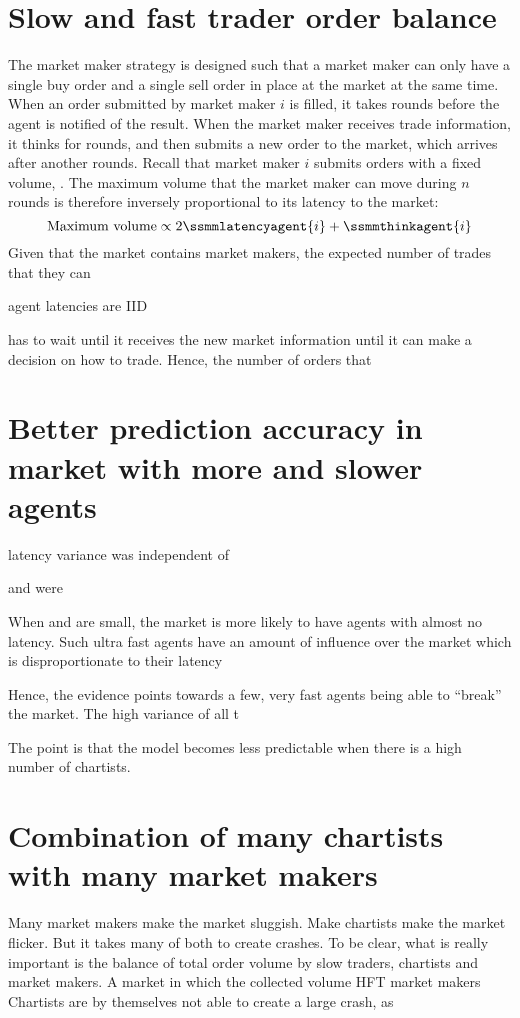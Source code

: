 \section{Slow and fast trader order balance}
The market maker strategy is designed such that a market maker can only have a single buy order and a single sell order in place at the market at the same time. When an order submitted by market maker $i$ is filled, it takes  rounds before the agent is notified of the result. When the market maker receives trade information, it thinks for  rounds, and then submits a new order to the market, which arrives after another  rounds. Recall that market maker $i$ submits orders with a fixed volume, . The maximum volume that the market maker can move during $n$ rounds is therefore inversely proportional to its latency to the market:
\[\text{Maximum volume} \propto 2\ssmmlatencyagent{i} + \ssmmthinkagent{i}\]
Given that the market contains \ssmmnAgents market makers, the expected number of trades that they can 

agent latencies are IID

has to wait until it receives the new market information until it can make a decision on how to trade. Hence, the number of orders that 

\section{Better prediction accuracy in market with more and slower agents}
latency variance was independent of 

\ssmmlatencys and \sclatencys were 

When \ssmmlatencymu{} and \sclatencymu{} are small, the market is more likely to have agents with almost no latency. Such ultra fast agents have an amount of influence over the market which is disproportionate to their latency


Hence, the evidence points towards a few, very fast agents being able to ``break'' the market.
The high variance of all t

The point is that the model becomes less predictable when there is a high number of chartists. 


\section{Combination of many chartists with many market makers}
Many market makers make the market sluggish.
Make chartists make the market flicker.
But it takes many of both to create crashes.
To be clear, what is really important is the balance of total order volume by slow traders, chartists and market makers.
A market in which the collected volume HFT market makers 
Chartists are by themselves not able to create a large crash, as



